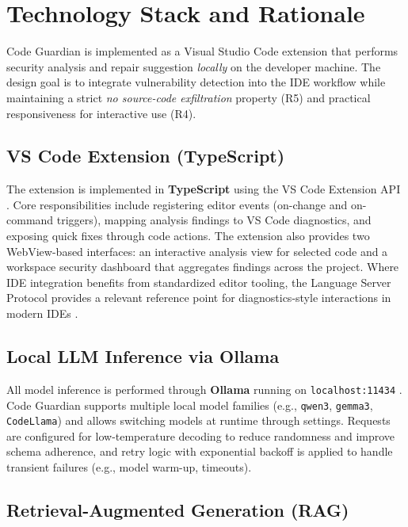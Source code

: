 \section{Technology Stack and Rationale}
\label{sec:impl-tech-stack}

Code Guardian is implemented as a Visual Studio Code extension that performs security analysis and repair suggestion \emph{locally} on the developer machine. The design goal is to integrate vulnerability detection into the IDE workflow while maintaining a strict \textit{no source-code exfiltration} property (R5) and practical responsiveness for interactive use (R4).

\subsection*{VS Code Extension (TypeScript)}

The extension is implemented in \textbf{TypeScript} using the VS Code Extension API \cite{vscodeExtensionApi}. Core responsibilities include registering editor events (on-change and on-command triggers), mapping analysis findings to VS Code diagnostics, and exposing quick fixes through code actions. The extension also provides two WebView-based interfaces: an interactive analysis view for selected code and a workspace security dashboard that aggregates findings across the project. Where IDE integration benefits from standardized editor tooling, the Language Server Protocol provides a relevant reference point for diagnostics-style interactions in modern IDEs \cite{languageServerProtocol}.

\subsection*{Local LLM Inference via Ollama}

All model inference is performed through \textbf{Ollama} running on \texttt{localhost:11434} \cite{ollamaDocs}. Code Guardian supports multiple local model families (e.g., \texttt{qwen3}, \texttt{gemma3}, \texttt{CodeLlama}) and allows switching models at runtime through settings. Requests are configured for low-temperature decoding to reduce randomness and improve schema adherence, and retry logic with exponential backoff is applied to handle transient failures (e.g., model warm-up, timeouts).

\subsection*{Retrieval-Augmented Generation (RAG)}

